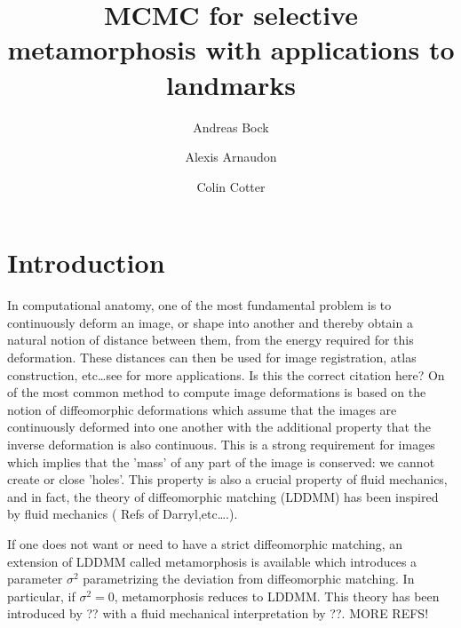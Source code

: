 \documentclass[runningheads]{llncs}
\begin{document}
%
\title{MCMC for selective metamorphosis with applications to landmarks}
%
%
\author{Andreas Bock \and  Alexis Arnaudon \and Colin Cotter}
%
%
%
\maketitle              %

\begin{abstract}


\end{abstract}

\section{Introduction}

In computational anatomy, one of the most fundamental problem is to continuously deform an image, or shape into another and thereby obtain a natural notion of distance between them, from the energy required for this deformation. 
These distances can then be used for image registration, atlas construction, etc\dots see \cite{younes2010shapes} for more applications. {\color{red} Is this the correct citation here?}
On of the most common method to compute image deformations is based on the notion of diffeomorphic deformations which assume that the images are continuously deformed into one another with the additional property that the inverse deformation is also continuous. 
This is a strong requirement for images which implies that the 'mass' of any part of the image is conserved: we cannot create or close 'holes'. 
This property is also a crucial property of fluid mechanics, and in fact, the theory of diffeomorphic matching (LDDMM) has been inspired by fluid mechanics ({\color{red} Refs of Darryl,etc\dots.}).

If one does not want or need to have a strict diffeomorphic matching, an extension of LDDMM called metamorphosis is available which introduces a parameter $\sigma^2$ parametrizing the deviation from diffeomorphic matching. 
In particular, if $\sigma^2=0$, metamorphosis reduces to LDDMM. 
{\color{red} This theory has been introduced by ?? with a fluid mechanical interpretation by ??. MORE REFS!}
\end{document}

